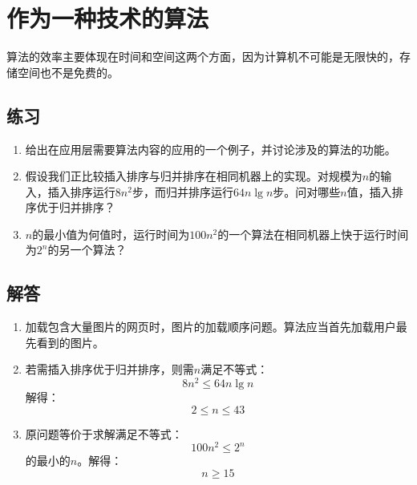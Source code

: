 \documentclass[UTF8,a4paper,zihao=-4,oneside,onecolumn,scheme=chinese,autoindent=true]{ctexbook}
\begin{document}
\section{作为一种技术的算法}
算法的效率主要体现在时间和空间这两个方面，因为计算机不可能是无限快的，存储空间也不是免费的。

\subsection*{练习}
\begin{enumerate}
    \renewcommand{\labelenumi}{\thesection-\theenumi}
    \item 给出在应用层需要算法内容的应用的一个例子，并讨论涉及的算法的功能。
    \item 假设我们正比较插入排序与归并排序在相同机器上的实现。对规模为$n$的输入，插入排序运行$8n^2$步，而归并排序运行$64n\lg{n}$步。问对哪些$n$值，插入排序优于归并排序？
    \item $n$的最小值为何值时，运行时间为$100n^2$的一个算法在相同机器上快于运行时间为$2^n$的另一个算法？
\end{enumerate}

\subsection*{解答}
\begin{enumerate}
    \renewcommand{\labelenumi}{\thesection-\theenumi}
    \item 加载包含大量图片的网页时，图片的加载顺序问题。算法应当首先加载用户最先看到的图片。
    \item {
          若需插入排序优于归并排序，则需$n$满足不等式：
          \[ 8n^2 \le 64n\lg{n} \]
          解得：
          \[ 2 \leq n \leq 43 \]
          }
    \item {
          原问题等价于求解满足不等式：
          \[ 100n^2 \le 2^n \]
          的最小的$n$。解得：
          \[ n \geq 15 \]
          }
\end{enumerate}

\end{document}
